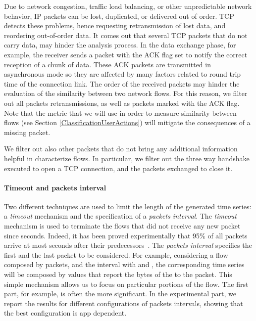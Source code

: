 \documentclass{acm_proc_article-sp}
\newcommand{\hilight}[1]{#1}
\begin{document}
Due to network congestion, traffic load balancing, or other unpredictable 
network behavior, IP packets can be lost, duplicated, or delivered out of order. 
TCP detects these problems, hence requesting retransmission of lost data, and 
reordering out-of-order data. It comes out that several TCP packets that do not 
carry data, may hinder the analysis process.
In the data exchange phase, for example, the receiver sends a packet with the ACK flag set to notify the correct reception of a chunk of data. 
These ACK packets are transmitted in asynchronous mode so they are affected by many factors related to round trip time of the connection link. 
The order of the received packets may hinder the evaluation of the similarity between two network flows.
For this reason, we filter out all packets retransmissions, as well as packets marked with the ACK flag.
\hilight{Note that the metric that we will use in order to measure similarity between flows (see Section }
\ref{ClassificationUserActions}) \hilight{will mitigate the consequences of a missing packet.
}
We filter out also other packets that do not bring any additional information helpful in characterize flows. In particular, we filter out the three way handshake executed to open a TCP connection, and the packets exchanged to close it.





\paragraph{Timeout and packets interval}
\label{ActiveInactiveTimeouts}




Two different techniques are used to limit the length of the generated time series: 
a \emph{timeout} mechanism and the specification of a \emph{packets interval}. 
The \emph{timeout} mechanism is used to terminate the flows that did not receive any new packet
since  seconds. Indeed, it has been proved experimentally that 95\% of all packets arrive at most  seconds after
their predecessors~\cite{Stober:2013:YSY:2462096.2462099}. The \emph{packets interval} 
specifies the first and the last packet to be considered. 
For example, considering a flow  composed by  packets, and the interval  with  and , 
the corresponding time series will be composed by  values that report the bytes of the 
 to the  packet. 
This simple 
mechanism allows us to focus on particular portions of the flow. The first part, for example, is often the 
more significant. In the experimental part, we report the results for different 
configurations of packets intervals, showing that the best configuration is 
app dependent.  
\end{document}

